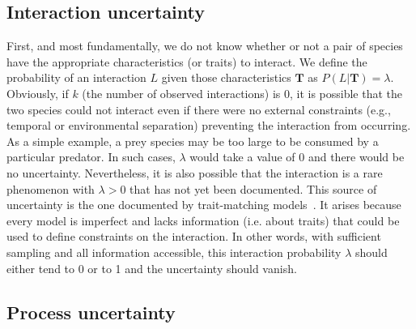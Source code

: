 \documentclass[12pt]{article}
\begin{document}
\begin{spacing}{2.0}
    \subsection*{Interaction uncertainty} 

    First, and most fundamentally, we do not know whether or not a pair of species have the appropriate characteristics (or traits) to interact. We define the probability of an interaction $L$ given those characteristics $\mathbf{T}$ as $P(L | \mathbf{T})=\lambda$. Obviously, if $k$ (the number of observed interactions) is 0, it is possible that the two species could not interact even if there were no external constraints (e.g., temporal or environmental separation) preventing the interaction from occurring. As a simple example, a prey species may be too large to be consumed by a particular predator. In such cases, $\lambda$ would take a value of 0 and there would be no uncertainty. 
    Nevertheless, it is also possible that the interaction is a rare phenomenon with $\lambda>0$ that has not yet been documented. This source of uncertainty is the one documented by trait-matching models~\citep{Bartomeus2016}. It arises because every model is imperfect and lacks information (i.e. about traits) that could be used to define constraints on the interaction. In other words, with sufficient sampling and all information accessible, this interaction probability $\lambda$ should either tend to 0 or to 1 and the uncertainty should vanish. 

    \subsection*{Process uncertainty} 


\end{spacing}
\end{document}
